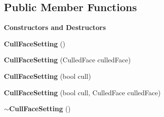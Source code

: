 \subsection*{Public Member Functions}
\begin{Indent}\textbf{ Constructors and Destructors}\par
\begin{DoxyCompactItemize}
\item 
\mbox{\label{classrev_1_1_cull_face_setting_ae9f7109ca0e4abe29ff30f89c9786e8e}} 
{\bfseries Cull\+Face\+Setting} ()
\item 
\mbox{\label{classrev_1_1_cull_face_setting_ade581039fd4dfba935fe1bbb69ee73dd}} 
{\bfseries Cull\+Face\+Setting} (Culled\+Face culled\+Face)
\item 
\mbox{\label{classrev_1_1_cull_face_setting_a65489e04d1d1554a18fb07bf6343d488}} 
{\bfseries Cull\+Face\+Setting} (bool cull)
\item 
\mbox{\label{classrev_1_1_cull_face_setting_ac79fa7f3266a96cf885ba6ddba625a09}} 
{\bfseries Cull\+Face\+Setting} (bool cull, Culled\+Face culled\+Face)
\item 
\mbox{\label{classrev_1_1_cull_face_setting_a344b61377263319ba7f21c546d5bcd81}} 
{\bfseries $\sim$\+Cull\+Face\+Setting} ()
\end{DoxyCompactItemize}
\end{Indent}
